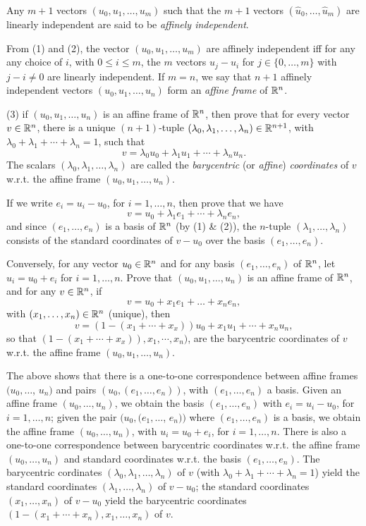 \documentclass[12pt]{article}
\begin{document}
\medskip
Any $m + 1$ vectors  $(u_0, u_1, \ldots, u_{m })$ such that
the  $m + 1$ vectors
$(\widehat{u}_0, \ldots,  \widehat{u}_m)$ are linearly independent
are said to be {\it affinely independent\/}.

\medskip
From (1) and (2), the vector $(u_0, u_1, \ldots, u_{m })$ 
are affinely independent iff
for any  any choice of $i$, with $0 \leq i \leq m$, the
$m$ vectors $u_j - u_i$  for $j \in \{0, \ldots, m\}$ with $j - i \not = 0$
are linearly independent.
If $m = n$,  we say that $n + 1$ affinely independent 
vectors  $(u_0, u_1, \ldots, u_{n })$ form an {\it affine frame\/} of $\mathbb{R}^n$. 

\medskip
(3) if $(u_0, u_1, \ldots, u_{n })$ is an affine frame of $\mathbb{R}^n$,
then prove that for every vector $v\in \mathbb{R}^n$,  
there is a unique $(n + 1)$-tuple
$(\lambda_0, \lambda_1, \ldots, \lambda_n)\in \mathbb{R}^{n + 1}$, with
$\lambda_0 + \lambda_1 + \cdots + \lambda_n = 1$, such that
\[
v = \lambda_0 u_0 + \lambda_1 u_1 + \cdots + \lambda_n u_n.
\]
The scalars $(\lambda_0, \lambda_1, \ldots, \lambda_n)$ are called the
{\it barycentric\/} (or {\it affine\/}) {\it coordinates\/} of $v$
w.r.t. the affine frame   $(u_0, u_1, \ldots, u_{n })$.

\medskip
If we write $e_i = u_i -  u_0$, for $i = 1, \ldots, n$, then prove that
we have
\[
v = u_0 + \lambda_1 e_1 + \cdots + \lambda_n e_n,
\]
and since $(e_1, \ldots, e_n)$ is a basis of $\mathbb{R}^n$ (by (1) \&
(2)), the $n$-tuple $(\lambda_1, \ldots, \lambda_n)$ consists of the 
standard coordinates of $v - u_0$ over the basis $(e_1, \ldots, e_n)$.

\medskip
Conversely, for any vector $u_0\in \mathbb{R}^n$ and for any basis
$(e_1, \ldots, e_n)$ of $\mathbb{R}^n$, let
$u_i = u_0 + e_i$ for $i = 1, \ldots, n$. Prove
that $(u_0, u_1, \ldots, u_n)$ is an affine frame of $\mathbb{R}^n$, 
and for any $v\in \mathbb{R}^n$, if  
\[
v = u_0 + x_1 e_1 + \dots + x_n e_n,
\]
with $(x_1, \ldots, x_n) \in \mathbb{R}^n$ (unique), then
\[
v = (1 - (x_1 + \cdots + x_x)) u_0 + x_1 u_1 + \cdots + x_n u_n,
\]
so that $(1 - (x_1 + \cdots + x_x)), x_1, \cdots,  x_n)$,
are the barycentric coordinates of $v$ w.r.t. the affine frame
$(u_0, u_1, \ldots, u_n)$.

\medskip
The above shows that there is a one-to-one correspondence between
affine frames $(u_0, \ldots$, $u_n)$ and pairs
$(u_0, (e_1, \ldots, e_n))$, with  $(e_1, \ldots, e_n)$  a basis.
Given  an affine frame  $(u_0, \ldots, u_n)$, we obtain the basis
$(e_1, \ldots, e_n)$ with $e_i = u_i - u_0$, for $i = 1, \ldots, n$;
given the pair $(u_0, (e_1, \ldots$, $e_n))$ where  $(e_1, \ldots, e_n)$
is a basis,  we obtain the affine frame   $(u_0, \ldots, u_n)$, with
$u_i = u_0 + e_i$, for $i = 1, \ldots, n$.
There is also a  one-to-one correspondence between
barycentric coordinates w.r.t. the affine frame
$(u_0, \ldots, u_n)$ and standard coordinates w.r.t.
the basis   $(e_1, \ldots, e_n)$.
The barycentric cordinates $(\lambda_0, \lambda_1, \ldots, \lambda_n)$
of $v$
(with $\lambda_0 + \lambda_1 + \cdots + \lambda_n = 1$) 
yield the standard coordinates $(\lambda_1, \ldots, \lambda_n)$ of $v - u_0$;
the standard coordinates $(x_1, \ldots, x_n)$ of $v - u_0$ yield the 
barycentric coordinates $(1 - (x_1 + \cdots + x_n ), x_1, \ldots,
x_n)$ of $v$.
\end{document}
